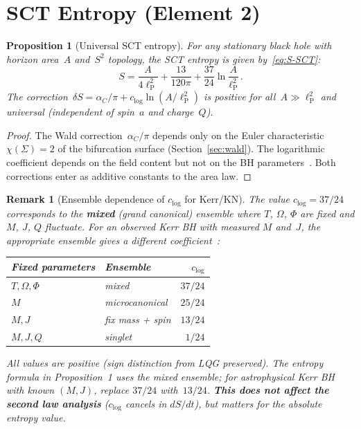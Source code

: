 \documentclass[11pt,a4paper]{article}
\newtheorem{proposition}[theorem]{Proposition}
\newtheorem{remark}{Remark}[section]
\newcommand{\lP}{\ell_{\mathrm{P}}}
\newcommand{\alpC}{\alpha_C}
\newcommand{\clog}{c_{\log}}
\begin{document}
\section{SCT Entropy (Element 2)}\label{sec:entropy}

\begin{proposition}[Universal SCT entropy]\label{prop:S-universal}
For \emph{any} stationary black hole with horizon area~$A$ and~$S^2$
topology, the SCT entropy is given by~\eqref{eq:S-SCT}:
\[
  S = \frac{A}{4\lP^2} + \frac{13}{120\pi} + \frac{37}{24}\ln\frac{A}{\lP^2}\,.
\]
The correction~$\delta S = \alpC/\pi + \clog\ln(A/\lP^2)$ is positive
for all~$A \gg \lP^2$ and universal (independent of spin~$a$ and
charge~$Q$).
\end{proposition}

\begin{proof}
The Wald correction~$\alpC/\pi$ depends only on the Euler
characteristic~$\chi(\Sigma) = 2$ of the bifurcation surface
(Section~\ref{sec:wald}).  The logarithmic coefficient depends on the
field content but not on the BH parameters~\cite{Sen2012}.
Both corrections enter as additive constants to the area law.
\end{proof}

\begin{remark}[Ensemble dependence of $\clog$ for Kerr/KN]
  The value $\clog = 37/24$ corresponds to the \textbf{mixed}
  (grand canonical) ensemble where $T$, $\Omega$, $\Phi$ are fixed
  and $M$, $J$, $Q$ fluctuate.  For an observed Kerr BH with
  measured $M$ and~$J$, the appropriate ensemble gives a different
  coefficient~\cite{Sen2012}:
  \begin{center}
  \begin{tabular}{llr}
  \toprule
  Fixed parameters & Ensemble & $\clog$ \\
  \midrule
  $T, \Omega, \Phi$ & mixed & $37/24$ \\
  $M$ & microcanonical & $25/24$ \\
  $M, J$ & fix mass + spin & $13/24$ \\
  $M, J, Q$ & singlet & $1/24$ \\
  \bottomrule
  \end{tabular}
  \end{center}
  All values are positive (sign distinction from LQG preserved).
  The entropy formula in Proposition~1 uses the mixed ensemble;
  for astrophysical Kerr BH with known $(M, J)$, replace $37/24$
  with~$13/24$.
  \textbf{This does not affect the second law analysis}
  ($c_{\log}$ cancels in $dS/dt$), but matters for the absolute
  entropy value.
\end{remark}
\end{document}
